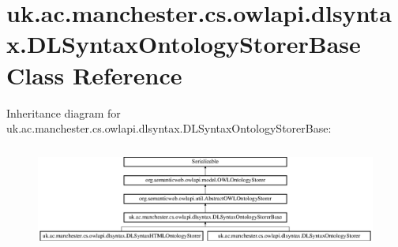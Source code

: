 \hypertarget{classuk_1_1ac_1_1manchester_1_1cs_1_1owlapi_1_1dlsyntax_1_1_d_l_syntax_ontology_storer_base}{\section{uk.\-ac.\-manchester.\-cs.\-owlapi.\-dlsyntax.\-D\-L\-Syntax\-Ontology\-Storer\-Base Class Reference}
\label{classuk_1_1ac_1_1manchester_1_1cs_1_1owlapi_1_1dlsyntax_1_1_d_l_syntax_ontology_storer_base}
}
Inheritance diagram for uk.\-ac.\-manchester.\-cs.\-owlapi.\-dlsyntax.\-D\-L\-Syntax\-Ontology\-Storer\-Base\-:\begin{figure}[H]
\begin{center}
\leavevmode
\includegraphics[height=3.456790cm]{classuk_1_1ac_1_1manchester_1_1cs_1_1owlapi_1_1dlsyntax_1_1_d_l_syntax_ontology_storer_base}
\end{center}
\end{figure}
